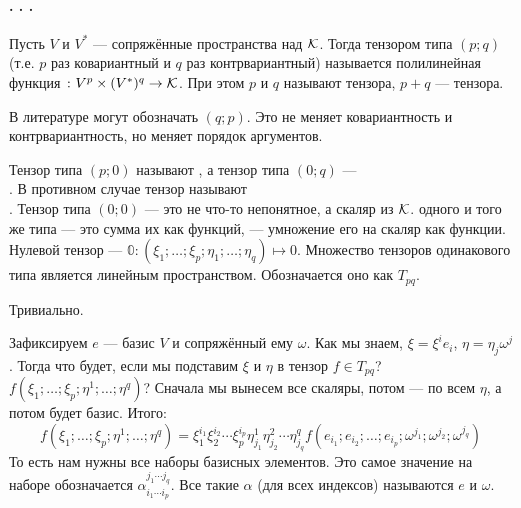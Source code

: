 \documentclass{article}
\begin{document}
    \paragraph{. . .}
    \begin{itemize}
        \dfn Пусть $V$ и $V^*$ --- сопряжённые пространства над ${\mathcal{K}}$. Тогда тензором типа $(p;q)$ (т.е. $p$ раз ковариантный и $q$ раз контрвариантный) называется полилинейная функция $\colon V^p\times(V^*)^q\to{\mathcal{K}}$. При этом $p$ и $q$ называют  тензора, $p+q$ ---  тензора.
        \begin{Comment}
            В литературе могут обозначать $(q;p)$. Это не меняет ковариантность и контрвариантность, но меняет порядок аргументов.
        \end{Comment}
        \dfn Тензор типа $(p;0)$ называют , а тензор типа $(0;q)$ ---\\. В противном случае тензор называют \\. Тензор типа $(0;0)$ --- это не что-то непонятное, а скаляр из ${\mathcal{K}}$.
        \dfn {} одного и того же типа --- это сумма их как функций,  --- умножение его на скаляр как функции.
        \dfn Нулевой тензор --- $\mathbb0\colon(\xi_1;\ldots;\xi_p;\eta_1;\ldots;\eta_q)\mapsto0$.
        \thm Множество тензоров одинакового типа является линейным пространством. Обозначается оно как $T_{pq}$.
        \begin{Proof}
            Тривиально.
        \end{Proof}
        \dfn Зафиксируем $e$ --- базис $V$ и сопряжённый ему $\omega$. Как мы знаем, $\xi=\xi^ie_i$, $\eta=\eta_j\omega^j$. Тогда что будет, если мы подставим $\xi$ и $\eta$ в тензор $f\in T_{pq}$? $f(\xi_1;\ldots;\xi_p;\eta^1;\ldots;\eta^q)$? Сначала мы вынесем все скаляры, потом --- по всем $\eta$, а потом будет базис. Итого:
        $$
        f(\xi_1;\ldots;\xi_p;\eta^1;\ldots;\eta^q)=\xi_1^{i_1}\xi_2^{i_2}\cdots\xi_p^{i_p}\eta^1_{j_1}\eta^2_{j_2}\cdots\eta^q_{j_q}f(e_{i_1};e_{i_2};\ldots;e_{i_p};\omega^{j_1};\omega^{j_2};\omega^{j_q})
        $$
        То есть нам нужны все наборы базисных элементов. Это самое значение на наборе обозначается $\alpha_{i_1\cdots i_p}^{j_1\cdots j_q}$. Все такие $\alpha$ (для всех индексов) называются  $e$ и $\omega$.

\end{itemize}
\end{document}
